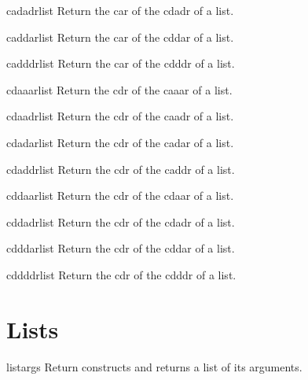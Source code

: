 \documentclass[10pt,english]{book}
\begin{document}
\begin{accessor}{cadadr}{list}
  Return the car of the cdadr of a list.
\end{accessor}

\begin{accessor}{caddar}{list}
  Return the car of the cddar of a list.
\end{accessor}

\begin{accessor}{cadddr}{list}
  Return the car of the cdddr of a list.
\end{accessor}

\begin{accessor}{cdaaar}{list}
  Return the cdr of the caaar of a list.
\end{accessor}

\begin{accessor}{cdaadr}{list}
  Return the cdr of the caadr of a list.
\end{accessor}

\begin{accessor}{cdadar}{list}
  Return the cdr of the cadar of a list.
\end{accessor}

\begin{accessor}{cdaddr}{list}
  Return the cdr of the caddr of a list.
\end{accessor}

\begin{accessor}{cddaar}{list}
  Return the cdr of the cdaar of a list.
\end{accessor}

\begin{accessor}{cddadr}{list}
  Return the cdr of the cdadr of a list.
\end{accessor}

\begin{accessor}{cdddar}{list}
  Return the cdr of the cddar of a list.
\end{accessor}

\begin{accessor}{cddddr}{list}
  Return the cdr of the cdddr of a list.
\end{accessor}

\section{Lists}
\label{sec:lists}

\begin{function}{list}{\rest args}
  Return constructs and returns a list of its arguments.
\end{function}
\end{document}
